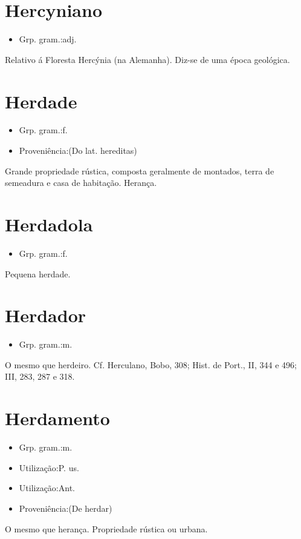 \documentclass{article}
\begin{document}
\section{Hercyniano}
\begin{itemize}
\item {Grp. gram.:adj.}
\end{itemize}
Relativo á Floresta Hercýnia (na Alemanha).
Diz-se de uma época geológica.
\section{Herdade}
\begin{itemize}
\item {Grp. gram.:f.}
\end{itemize}
\begin{itemize}
\item {Proveniência:(Do lat. \textunderscore hereditas\textunderscore )}
\end{itemize}
Grande propriedade rústica, composta geralmente de montados, terra de semeadura e casa de habitação.
Herança.
\section{Herdadola}
\begin{itemize}
\item {Grp. gram.:f.}
\end{itemize}
Pequena herdade.
\section{Herdador}
\begin{itemize}
\item {Grp. gram.:m.}
\end{itemize}
O mesmo que \textunderscore herdeiro\textunderscore . Cf. Herculano, \textunderscore Bobo\textunderscore , 308; \textunderscore Hist. de Port.\textunderscore , II, 344 e 496; III, 283, 287 e 318.
\section{Herdamento}
\begin{itemize}
\item {Grp. gram.:m.}
\end{itemize}
\begin{itemize}
\item {Utilização:P. us.}
\end{itemize}
\begin{itemize}
\item {Utilização:Ant.}
\end{itemize}
\begin{itemize}
\item {Proveniência:(De \textunderscore herdar\textunderscore )}
\end{itemize}
O mesmo que \textunderscore herança\textunderscore .
Propriedade rústica ou urbana.
\end{document}
